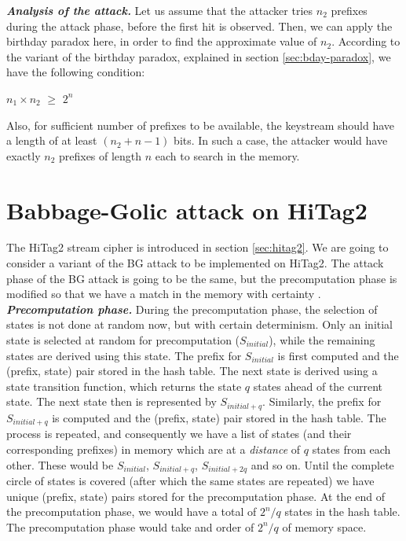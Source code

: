 \textit{\textbf{Analysis of the attack.}} Let us assume that the attacker tries $n_2$ prefixes during the attack phase, before the first hit is observed. Then, we can apply the birthday paradox here, in order to find the approximate value of $n_2$. According to the variant of the birthday paradox, explained in section \ref{sec:bday-paradox}, we have the following condition:

\begin{center}
\large{$n_1 \times n_2$ $\geq$ $2^n$}
\end{center}

Also, for sufficient number of prefixes to be available, the keystream should have a length of at least $(n_2 + n - 1)$ bits. In such a case, the attacker would have exactly $n_2$ prefixes of length $n$ each to search in the memory.


\section{Babbage-Golic attack on HiTag2}

The HiTag2 stream cipher is introduced in section \ref{sec:hitag2}. We are going to consider a variant of the BG attack to be implemented on HiTag2. The attack phase of the BG attack is going to be the same, but the precomputation phase is modified so that we have a match in the memory with certainty \cite{erik-discussions}. \\

\textit{\textbf{Precomputation phase.}} During the precomputation phase, the selection of states is not done at random now, but with certain determinism. Only an initial state is selected at random for precomputation ($S_{initial}$), while the remaining states are derived using this state. The prefix for $S_{initial}$ is first computed and the (prefix, state) pair stored in the hash table. The next state is derived using a state transition function, which returns the state $q$ states ahead of the current state. The next state then is represented by $S_{initial+q}$. Similarly, the prefix for $S_{initial+q}$ is computed and the (prefix, state) pair stored in the hash table. The process is repeated, and consequently we have a list of states (and their corresponding prefixes) in memory which are at a \emph{distance} of $q$ states from each other. These would be $S_{initial}$, $S_{initial+q}$, $S_{initial+2q}$ and so on. Until the complete circle of states is covered (after which the same states are repeated) we have unique (prefix, state) pairs stored for the precomputation phase. At the end of the precomputation phase, we would have a total of $2^n/q$ states in the hash table. The precomputation phase would take and order of $2^n/q$ of memory space.\\

